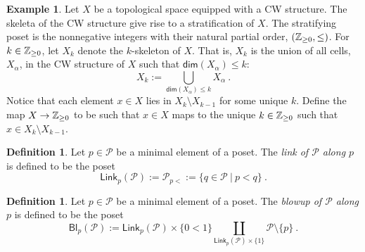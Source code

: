 \documentclass{article}
\newcommand{\mc}[1]{\mathcal{#1}}
\newcommand{\msf}[1]{\mathsf{#1}}
\newcommand{\link}{\msf{Link}}
\newcommand{\bl}{\msf{Bl}}
\renewcommand{\dim}{\msf{dim}}
\theoremstyle{definition}
\newtheorem{definition}[theorem]{Definition}
\newtheorem{example}[theorem]{Example}
\begin{document}
\begin{example}
    Let $X$ be a topological space equipped with a CW structure. 
    The skeleta of the CW structure give rise to a stratification of $X$.
    The stratifying poset is the nonnegative integers with their natural partial order, $(\mathbb Z_{\ge0},\le)$.
    For $k \in \mathbb Z_{\ge0}$, let $X_k$ denote the $k$-skeleton of $X$. That is, $X_k$ is the union of all cells, 
    $X_\alpha$, in the CW structure of $X$ such that $\dim(X_\alpha) \le k$:
    $$X_k := \bigcup_{\dim(X_\alpha)\le k} X_\alpha~.$$
    Notice that each element $x \in X$ lies in $X_k \setminus X_{k-1}$ for some unique $k$.
    Define the map $X \to \mathbb Z_{\ge0}$ to be such that $x \in X$ maps to the unique $k \in \mathbb Z_{\ge0}$ such that
    $x \in X_k \setminus X_{k-1}.$
\end{example}

\begin{definition}
    Let $p \in \mc{P}$ be a minimal element of a poset. The \emph{link of $\mc{P}$ along $p$} is defined to be the
    poset
    $$\link_p(\mc{P}) := \mc{P}_{p<}:= \{q \in \mc{P} ~|~ p<q\}~.$$
\end{definition}

\begin{definition}
    Let $p \in \mc{P}$ be a minimal element of a poset. The \emph{blowup of $\mc{P}$ along $p$} is defined to be
    the poset
    $$\bl_p(\mc{P}) := \link_p(\mc{P}) \times \{0<1\} 
        \coprod_{\link_p(\mc{P}) \times \{1\}} \mc{P} \setminus \{p\}~.$$
\end{definition}
\end{document}
